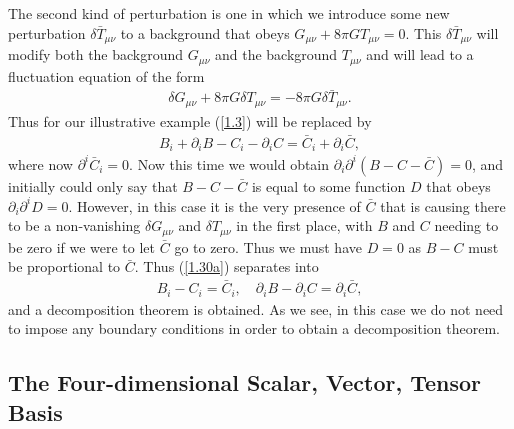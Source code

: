 \documentclass[aps,onecolumn,10pt]{revtex4}
\numberwithin{equation}{section}
\numberwithin{equation}{section}
\begin{document}
The second kind of perturbation is one in which we introduce some new perturbation $\delta \bar{T}_{\mu\nu}$ to a background that obeys $G_{\mu\nu}+8\pi G T_{\mu\nu}=0$. This $\delta \bar{T}_{\mu\nu}$ will modify both the background $G_{\mu\nu}$ and the background $T_{\mu\nu}$ and will lead to a fluctuation equation of the form 
%
\begin{eqnarray}
\delta G_{\mu\nu}+8\pi G \delta T_{\mu\nu}=-8 \pi G \delta \bar{T}_{\mu\nu}. 
\label{1.29a}
\end{eqnarray}
%
Thus for our illustrative example (\ref{1.3}) will be replaced by
%
\begin{eqnarray}
B_i+\partial_iB-C_i-\partial_iC=\bar{C}_i+\partial_i\bar{C},
\label{1.30a}
\end{eqnarray}
%
where now $\partial^i\bar{C}_i=0$. Now this time we would obtain $\partial_i\partial^i(B-C-\bar{C})=0$, and initially could only say that $B-C-\bar{C}$ is equal to some function $D$ that obeys $\partial_i\partial^iD=0$. However, in this case it is the very presence of $\bar{C}$ that is causing there to be a non-vanishing $\delta G_{\mu\nu}$ and $\delta T_{\mu\nu}$ in the first place, with $B$ and $C$ needing to be zero if we were to let $\bar{C}$ go to zero. Thus we must have $D=0$ as $B-C$ must be proportional to  $\bar{C}$. Thus (\ref{1.30a}) separates into 
%
\begin{eqnarray}
B_i-C_i=\bar{C}_i, \quad 
\partial_iB-\partial_iC=\partial_i\bar{C},
\label{1.31a}
\end{eqnarray}
%
and a decomposition theorem is obtained. As we see, in this case we do not need to impose any  boundary conditions in order to obtain a decomposition theorem.

\subsection{The Four-dimensional Scalar, Vector, Tensor Basis}
\label{S1e}
\end{document}

